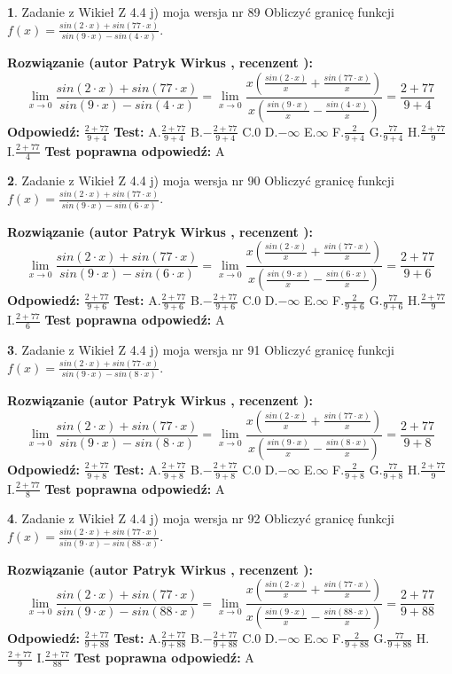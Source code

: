 \documentclass[12pt, a4paper]{article}
\theoremstyle{definition} %
\newtheorem{zad}{}
\newcommand{\zadStart}[1]{\begin{zad}#1\newline}
\newcommand{\zadStop}{\end{zad}}
\newcommand{\rozwStart}[2]{\noindent \textbf{Rozwiązanie (autor #1 , recenzent #2): }\newline}
\newcommand{\rozwStop}{\newline}
\newcommand{\odpStart}{\noindent \textbf{Odpowiedź:}\newline}
\newcommand{\odpStop}{\newline}
\newcommand{\testStart}{\noindent \textbf{Test:}\newline}
\newcommand{\testStop}{\newline}
\newcommand{\kluczStart}{\noindent \textbf{Test poprawna odpowiedź:}\newline}
\newcommand{\kluczStop}{\newline}
\begin{document}
\zadStart{Zadanie z Wikieł Z 4.4 j) moja wersja nr 89}
Obliczyć granicę funkcji $f(x)=\frac{sin(2\cdot x) +sin(77\cdot x)}{sin(9\cdot x) -sin(4\cdot x)}$.
\zadStop
\rozwStart{Patryk Wirkus}{}
$$\lim\limits_{x\to 0}\frac{sin(2\cdot x) +sin(77\cdot x)}{sin(9\cdot x) -sin(4\cdot x)}=\lim\limits_{x\to 0}\frac{x(\frac{sin(2\cdot x)}{x}+\frac{sin(77\cdot x)}{x})}{x(\frac{sin(9\cdot x)}{x}-\frac{sin(4\cdot x)}{x})}=\frac{2+77}{9+4}$$
\rozwStop
\odpStart
$\frac{2+77}{9+4}$
\odpStop
\testStart
A.$\frac{2+77}{9+4}$
B.$-\frac{2+77}{9+4}$
C.$0$
D.$-\infty$
E.$\infty$
F.$\frac{2}{9+4}$
G.$\frac{77}{9+4}$
H.$\frac{2+77}{9}$
I.$\frac{2+77}{4}$
\testStop
\kluczStart
A
\kluczStop



\zadStart{Zadanie z Wikieł Z 4.4 j) moja wersja nr 90}
Obliczyć granicę funkcji $f(x)=\frac{sin(2\cdot x) +sin(77\cdot x)}{sin(9\cdot x) -sin(6\cdot x)}$.
\zadStop
\rozwStart{Patryk Wirkus}{}
$$\lim\limits_{x\to 0}\frac{sin(2\cdot x) +sin(77\cdot x)}{sin(9\cdot x) -sin(6\cdot x)}=\lim\limits_{x\to 0}\frac{x(\frac{sin(2\cdot x)}{x}+\frac{sin(77\cdot x)}{x})}{x(\frac{sin(9\cdot x)}{x}-\frac{sin(6\cdot x)}{x})}=\frac{2+77}{9+6}$$
\rozwStop
\odpStart
$\frac{2+77}{9+6}$
\odpStop
\testStart
A.$\frac{2+77}{9+6}$
B.$-\frac{2+77}{9+6}$
C.$0$
D.$-\infty$
E.$\infty$
F.$\frac{2}{9+6}$
G.$\frac{77}{9+6}$
H.$\frac{2+77}{9}$
I.$\frac{2+77}{6}$
\testStop
\kluczStart
A
\kluczStop



\zadStart{Zadanie z Wikieł Z 4.4 j) moja wersja nr 91}
Obliczyć granicę funkcji $f(x)=\frac{sin(2\cdot x) +sin(77\cdot x)}{sin(9\cdot x) -sin(8\cdot x)}$.
\zadStop
\rozwStart{Patryk Wirkus}{}
$$\lim\limits_{x\to 0}\frac{sin(2\cdot x) +sin(77\cdot x)}{sin(9\cdot x) -sin(8\cdot x)}=\lim\limits_{x\to 0}\frac{x(\frac{sin(2\cdot x)}{x}+\frac{sin(77\cdot x)}{x})}{x(\frac{sin(9\cdot x)}{x}-\frac{sin(8\cdot x)}{x})}=\frac{2+77}{9+8}$$
\rozwStop
\odpStart
$\frac{2+77}{9+8}$
\odpStop
\testStart
A.$\frac{2+77}{9+8}$
B.$-\frac{2+77}{9+8}$
C.$0$
D.$-\infty$
E.$\infty$
F.$\frac{2}{9+8}$
G.$\frac{77}{9+8}$
H.$\frac{2+77}{9}$
I.$\frac{2+77}{8}$
\testStop
\kluczStart
A
\kluczStop



\zadStart{Zadanie z Wikieł Z 4.4 j) moja wersja nr 92}
Obliczyć granicę funkcji $f(x)=\frac{sin(2\cdot x) +sin(77\cdot x)}{sin(9\cdot x) -sin(88\cdot x)}$.
\zadStop
\rozwStart{Patryk Wirkus}{}
$$\lim\limits_{x\to 0}\frac{sin(2\cdot x) +sin(77\cdot x)}{sin(9\cdot x) -sin(88\cdot x)}=\lim\limits_{x\to 0}\frac{x(\frac{sin(2\cdot x)}{x}+\frac{sin(77\cdot x)}{x})}{x(\frac{sin(9\cdot x)}{x}-\frac{sin(88\cdot x)}{x})}=\frac{2+77}{9+88}$$
\rozwStop
\odpStart
$\frac{2+77}{9+88}$
\odpStop
\testStart
A.$\frac{2+77}{9+88}$
B.$-\frac{2+77}{9+88}$
C.$0$
D.$-\infty$
E.$\infty$
F.$\frac{2}{9+88}$
G.$\frac{77}{9+88}$
H.$\frac{2+77}{9}$
I.$\frac{2+77}{88}$
\testStop
\kluczStart
A
\kluczStop
\end{document}
